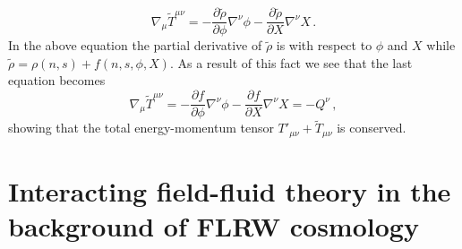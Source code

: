 \documentclass[a4paper,12pt]{article}
\newcommand{\ti}[1]{\ensuremath{ \tilde{#1}}}
\newcommand{\nb}{\ensuremath{ \nabla }}
\newcommand{\m}{\ensuremath{{\mu \nu}}}
\newcommand{\p}{\ensuremath{\partial{}}}
\begin{document}
%
\begin{equation}\label{final fluid conservation}
\nb_{\mu}	\ti{T}^{\m} =-\dfrac{\p \ti{\rho}}{\p \phi}\nb^{\nu}\phi  - \dfrac{\p \ti{\rho}}{\p X}\nb^{\nu}X\,.
\end{equation}
In the above equation the partial derivative of $\ti{\rho}$ is with respect to $\phi$ and $X$ while $\ti{\rho} = \rho(n,s) + f(n,s,\phi,X)$. As a result of this fact we see that the last equation becomes 
\begin{equation}\label{}
\nb_{\mu}	\ti{T}^{\m} =-\dfrac{\p f}{\p \phi}\nb^{\nu}\phi  - \dfrac{\p f}{\p X}\nb^{\nu}X = -Q^{\nu}\,,
\end{equation}
showing that the total energy-momentum tensor $T'_{\mu\nu}+\tilde{T}_{\mu\nu}$ is conserved.
\section{Interacting field-fluid theory in the background of FLRW cosmology}
\label{sec:3}	
	
\end{document}
